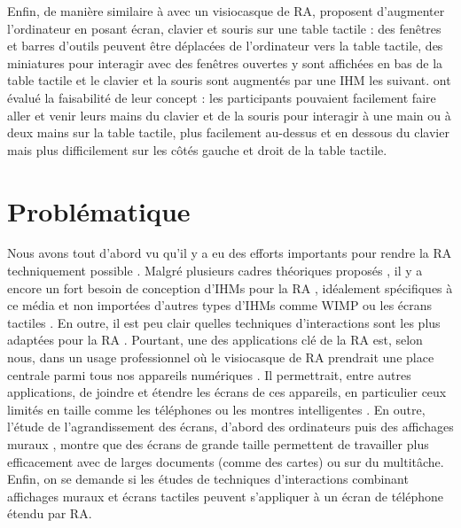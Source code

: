 
Enfin, de manière similaire à \cite{Serrano2015} avec un visiocasque de RA, \cite{Bi2011} proposent d'augmenter l'ordinateur en posant écran, clavier et souris sur une table tactile  : des fenêtres et barres d'outils peuvent être déplacées de l'ordinateur vers la table tactile, des miniatures pour interagir avec des fenêtres ouvertes y sont affichées en bas de la table tactile et le clavier et la souris sont augmentés par une IHM les suivant. \citeauthor{Bi2011} ont évalué la faisabilité de leur concept : les participants pouvaient facilement faire aller et venir leurs mains du clavier et de la souris pour interagir à une main ou à deux mains sur la table tactile, plus facilement au-dessus et en dessous du clavier mais plus difficilement sur les côtés gauche et droit de la table tactile.


\section{Problématique}
\label{sec:research_problem}

Nous avons tout d'abord vu qu'il y a eu des efforts importants pour rendre la RA techniquement possible \citep{Azuma2001, VanKrevelen2010}. Malgré plusieurs cadres théoriques proposés \citep{Milgram1994, Rekimoto1995, Bimber2005, Ens2014a}, il y a encore un fort besoin de conception d'IHMs pour la RA \citep{Billinghurst2015}, idéalement spécifiques à ce média et non importées d'autres types d'IHMs comme WIMP ou les écrans tactiles \citep{VanDam1997, Billinghurst2005}. En outre, il est peu clair quelles techniques d'interactions sont les plus adaptées pour la RA \citep{Argelaguet2013, Piumsomboon2013, Piumsomboon2014}. Pourtant, une des applications clé de la RA est, selon nous, dans un usage professionnel où le visiocasque de RA prendrait une place centrale parmi tous nos appareils numériques \citep{Rekimoto1995, Serrano2015}. Il permettrait, entre autres applications, de joindre et étendre les écrans de ces appareils, en particulier ceux limités en taille comme les téléphones ou les montres intelligentes \citep{Grubert2015}. En outre, l'étude de l'agrandissement des écrans, d'abord des ordinateurs \citep{Baudisch2002, Guiard2004} puis des affichages muraux \citep{Liu2014, Raedle2014}, montre que des écrans de grande taille permettent de travailler plus efficacement avec de larges documents (comme des cartes) ou sur du multitâche. Enfin, on se demande si les études de techniques d'interactions combinant affichages muraux et écrans tactiles \citep{Nancel2011, Berge2014} peuvent s'appliquer à un écran de téléphone étendu par RA.

